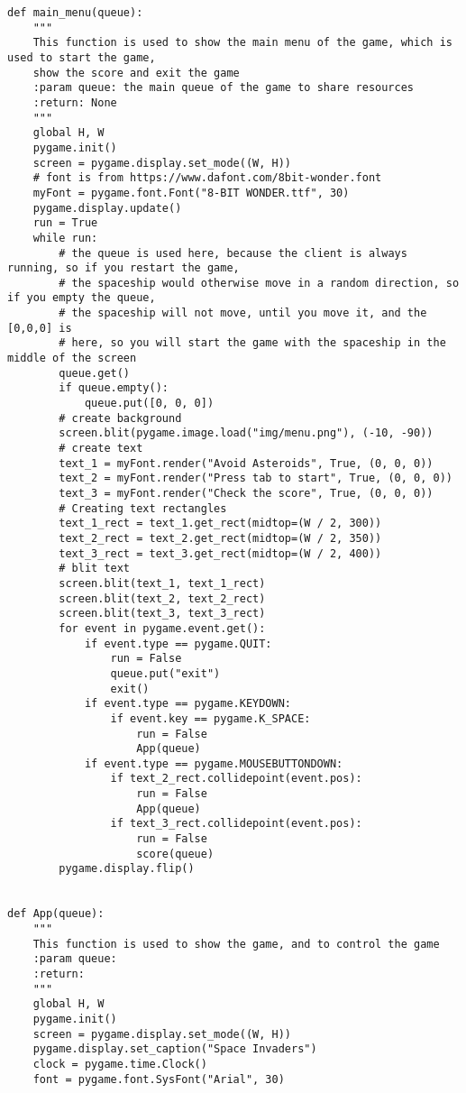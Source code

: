 \documentclass[12pt]{report}			%
\begin{document}
\begin{appendices}
\begin{lstlisting}[title={Program hra.py}, caption={hra.py},  label={lst:hra}]
def main_menu(queue):
    """
    This function is used to show the main menu of the game, which is used to start the game,
    show the score and exit the game
    :param queue: the main queue of the game to share resources
    :return: None
    """
    global H, W
    pygame.init()
    screen = pygame.display.set_mode((W, H))
    # font is from https://www.dafont.com/8bit-wonder.font
    myFont = pygame.font.Font("8-BIT WONDER.ttf", 30)
    pygame.display.update()
    run = True
    while run:
        # the queue is used here, because the client is always running, so if you restart the game,
        # the spaceship would otherwise move in a random direction, so if you empty the queue,
        # the spaceship will not move, until you move it, and the [0,0,0] is
        # here, so you will start the game with the spaceship in the middle of the screen
        queue.get()
        if queue.empty():
            queue.put([0, 0, 0])
        # create background
        screen.blit(pygame.image.load("img/menu.png"), (-10, -90))
        # create text
        text_1 = myFont.render("Avoid Asteroids", True, (0, 0, 0))
        text_2 = myFont.render("Press tab to start", True, (0, 0, 0))
        text_3 = myFont.render("Check the score", True, (0, 0, 0))
        # Creating text rectangles
        text_1_rect = text_1.get_rect(midtop=(W / 2, 300))
        text_2_rect = text_2.get_rect(midtop=(W / 2, 350))
        text_3_rect = text_3.get_rect(midtop=(W / 2, 400))
        # blit text
        screen.blit(text_1, text_1_rect)
        screen.blit(text_2, text_2_rect)
        screen.blit(text_3, text_3_rect)
        for event in pygame.event.get():
            if event.type == pygame.QUIT:
                run = False
                queue.put("exit")
                exit()
            if event.type == pygame.KEYDOWN:
                if event.key == pygame.K_SPACE:
                    run = False
                    App(queue)
            if event.type == pygame.MOUSEBUTTONDOWN:
                if text_2_rect.collidepoint(event.pos):
                    run = False
                    App(queue)
                if text_3_rect.collidepoint(event.pos):
                    run = False
                    score(queue)
        pygame.display.flip()


def App(queue):
    """
    This function is used to show the game, and to control the game
    :param queue:
    :return:
    """
    global H, W
    pygame.init()
    screen = pygame.display.set_mode((W, H))
    pygame.display.set_caption("Space Invaders")
    clock = pygame.time.Clock()
    font = pygame.font.SysFont("Arial", 30)


\end{lstlisting}
\end{appendices}
\end{document}
